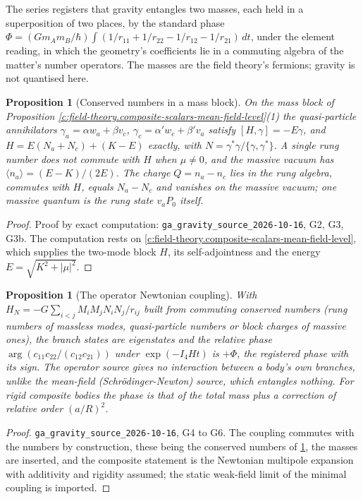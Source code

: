 \documentclass[11pt]{article}
\newtheorem{proposition}[theorem]{Proposition}
\theoremstyle{definition}
\theoremstyle{plain}
\begin{document}
\label{c:note.field-theory.setting-gravitys-source-registered-prediction}
The series registers that gravity entangles two masses, each held in a superposition of two places, by the standard phase $\Phi = (Gm_Am_B/\hbar)\int(1/r_{11} + 1/r_{22} - 1/r_{12} - 1/r_{21})\,dt$, under the element reading, in which the geometry's coefficients lie in a commuting algebra of the matter's number operators. The masses are the field theory's fermions; gravity is not quantised here.

\begin{proposition}[Conserved numbers in a mass block]\label{c:field-theory.conserved-numbers-mass-block}
On the mass block of Proposition \ref{c:field-theory.composite-scalars-mean-field-level}(1) the quasi-particle annihilators $\gamma_a = \alpha w_a + \beta v_c$, $\gamma_c = \alpha'w_c + \beta'v_a$ satisfy $[H, \gamma] = -E\gamma$, and $H = E(N_a + N_c) + (K - E)$ exactly, with $N = \gamma^*\gamma/\{\gamma, \gamma^*\}$. A single rung number does not commute with $H$ when $\mu \neq 0$, and the massive vacuum has $\langle n_a\rangle = (E - K)/(2E)$. The charge $Q = n_a - n_c$ lies in the rung algebra, commutes with $H$, equals $N_a - N_c$ and vanishes on the massive vacuum; one massive quantum is the rung state $v_aP_0$ itself.
\end{proposition}
\begin{proof}
Proof by exact computation: \texttt{ga\_gravity\_source\_2026-10-16}, G2, G3, G3b. The computation rests on \ref{c:field-theory.composite-scalars-mean-field-level}, which supplies the two-mode block $H$, its self-adjointness and the energy $E = \sqrt{K^2 + |\mu|^2}$.

\end{proof}

\begin{proposition}[The operator Newtonian coupling]\label{c:field-theory.operator-newtonian-coupling}
With $H_N = -G\sum_{i<j}M_iM_jN_iN_j/r_{ij}$ built from commuting conserved numbers (rung numbers of massless modes, quasi-particle numbers or block charges of massive ones), the branch states are eigenstates and the relative phase $\arg(c_{11}c_{22}/(c_{12}c_{21}))$ under $\exp(-I_4Ht)$ is $+\Phi$, the registered phase with its sign. The operator source gives no interaction between a body's own branches, unlike the mean-field (Schr\"odinger-Newton) source, which entangles nothing. For rigid composite bodies the phase is that of the total mass plus a correction of relative order $(a/R)^2$.
\end{proposition}
\begin{proof}
\texttt{ga\_gravity\_source\_2026-10-16}, G4 to G6. The coupling commutes with the numbers by construction, these being the conserved numbers of \ref{c:field-theory.conserved-numbers-mass-block}, the masses are inserted, and the composite statement is the Newtonian multipole expansion with additivity and rigidity assumed; the static weak-field limit of the minimal coupling is imported.

\end{proof}
\end{document}
